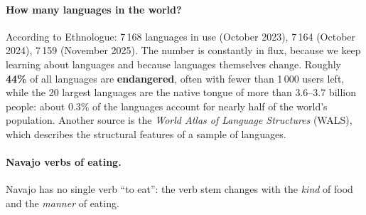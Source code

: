 \paragraph{How many languages in the world?}
According to Ethnologue: 7\,168 languages in use (October 2023), 7\,164 (October 2024),
7\,159 (November 2025). The number is constantly in flux, because we keep learning about
languages and because languages themselves change. Roughly \textbf{44\%} of all languages
are \textbf{endangered}, often with fewer than 1\,000 users left, while the 20 largest
languages are the native tongue of more than 3.6--3.7 billion people: about 0.3\% of the
languages account for nearly half of the world's population. Another source is the
\emph{World Atlas of Language Structures} (WALS), which describes the structural
features of a sample of languages.

\paragraph{Navajo verbs of eating.}
Navajo has no single verb ``to eat'': the verb stem changes with the \emph{kind} of food
and the \emph{manner} of eating.

